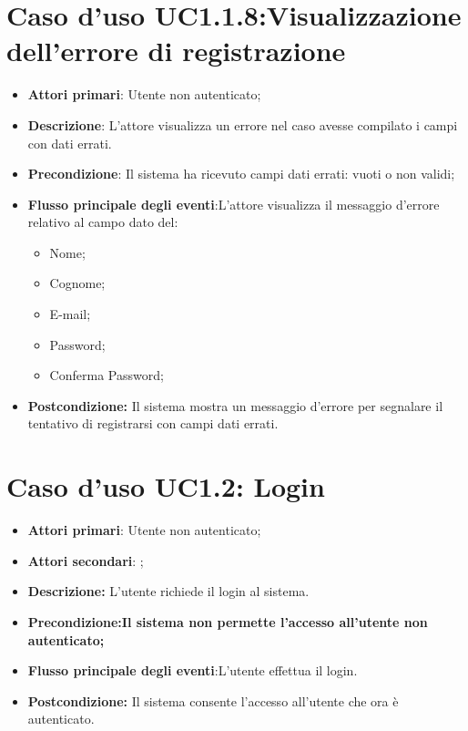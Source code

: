 {{{\section{Caso d'uso UC1.1.8:Visualizzazione dell'errore di registrazione}
\begin{itemize}
	\item \textbf{Attori primari}: Utente non autenticato;
	\item \textbf{Descrizione}: L'attore visualizza un errore nel caso avesse compilato i campi con dati errati.
	\item \textbf{Precondizione}: Il sistema ha ricevuto campi dati errati: vuoti o non validi;
	\item \textbf{Flusso principale degli eventi}:L'attore visualizza il messaggio d'errore relativo al campo dato  del:
		\begin{itemize}
		\item Nome;
		\item Cognome;
		\item E-mail;
		\item Password;
		\item Conferma Password;
	\end{itemize}
	\item \textbf{Postcondizione:} Il sistema mostra un messaggio d'errore per segnalare il tentativo di registrarsi con campi dati errati.
\end{itemize}
\section{Caso d'uso UC1.2: Login}
\begin{itemize}
	\item \textbf{Attori primari}: Utente non autenticato;
	\item \textbf{Attori secondari}: ;
	\item \textbf{Descrizione:} L'utente richiede il login al sistema.
	\item \textbf{Precondizione:Il sistema non permette l'accesso all'utente non autenticato;}
	\item \textbf{Flusso principale degli eventi}:L'utente effettua il login.
	\item \textbf{Postcondizione:} Il sistema consente l'accesso all'utente che ora è autenticato.
\end{itemize}
}}}
